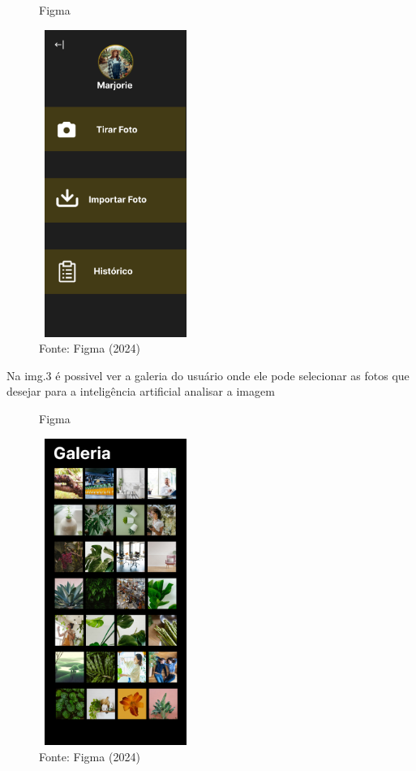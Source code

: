 \documentclass[
  a4paper,%
  12pt,%
  english,%
  brazilian,%
]{article}
\begin{document}
\begin{figure}[H]
    \centering
    \caption*{Figma}
    \includegraphics[width=5cm,height=10cm]{Illustrations/figma2.png}
    \caption*{Fonte: Figma (2024)}
    \label{fig:fig2}
\end{figure}

Na img.3 é possivel ver a galeria do usuário onde ele pode selecionar as fotos que desejar para a inteligência artificial analisar a imagem

\begin{figure}[H]
    \centering
    \caption*{Figma}
    \includegraphics[width=5cm,height=10cm]{Illustrations/figma3.png}
    \caption*{Fonte: Figma (2024)}
    \label{fig:fig3}
\end{figure}
\end{document}

